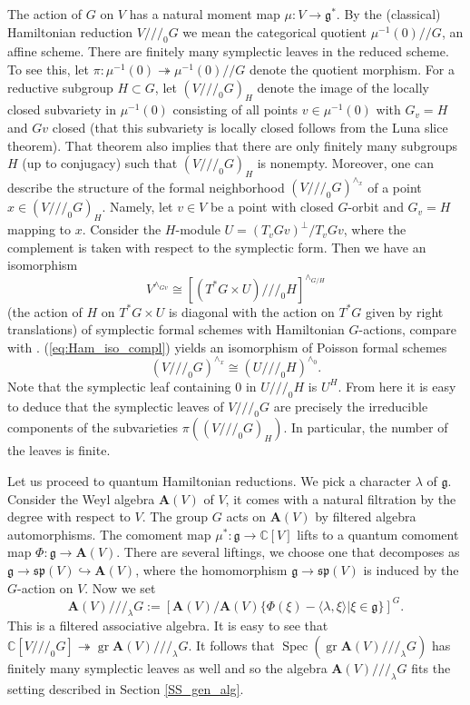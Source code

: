 \documentclass[12pt]{amsart}
\newcommand{\gr}{\operatorname{gr}}
\newcommand{\Weyl}{\mathbf{A}}
\newcommand{\g}{\mathfrak{g}}
\newcommand{\C}{\mathbb{C}}
\newcommand{\red}{/\!/\!/}
\newcommand{\quo}{/\!/}
\theoremstyle{definition}
\begin{document}
The action of $G$ on $V$ has a natural moment map $\mu:V\rightarrow \g^*$. By the (classical)
Hamiltonian reduction $V\red_0 G$ we mean the categorical quotient $\mu^{-1}(0)\quo G$,
an affine scheme. There are finitely many symplectic leaves in the reduced scheme.
To see this, let $\pi:\mu^{-1}(0)\twoheadrightarrow \mu^{-1}(0)\quo G$ denote the quotient
morphism. For a reductive subgroup $H\subset G$, let $(V\red_0 G)_H$ denote the image of
the locally closed subvariety in $\mu^{-1}(0)$ consisting of all points $v\in \mu^{-1}(0)$
with $G_v=H$ and $Gv$ closed (that this subvariety is locally closed follows from the Luna
slice theorem). That theorem also implies that there are only finitely many  subgroups
$H$ (up to conjugacy) such that $(V\red_0 G)_H$ is nonempty.  Moreover, one can describe the structure of the
formal neighborhood $(V\red_0 G)^{\wedge_x}$ of a point $x\in (V\red_0 G)_H$.
Namely, let $v\in V$ be a point with closed $G$-orbit and $G_v=H$ mapping to $x$.
Consider the $H$-module $U=(T_v Gv)^{\perp}/T_v Gv$, where the complement is taken with respect
to the symplectic form. Then we have an isomorphism
\begin{equation}\label{eq:Ham_iso_compl} V^{\wedge_{Gv}}\cong [(T^*G\times U)\red_0 H]^{\wedge_{G/H}}\end{equation}
(the action of $H$ on $T^*G\times U$
is diagonal with the action on $T^*G$ given by right translations) of symplectic formal
schemes with Hamiltonian $G$-actions, compare with \cite[Section 4]{CB_norm}. (\ref{eq:Ham_iso_compl}) yields an isomorphism of Poisson
formal schemes
\begin{equation}\label{eq:iso_compl}
(V\red_0 G)^{\wedge_x}\cong (U\red_0 H)^{\wedge_0}.
\end{equation}
Note that the symplectic leaf containing $0$ in $U\red_0 H$ is $U^H$. 
From here it is easy to deduce that the symplectic leaves of $V\red_0 G$ are precisely the irreducible
components of the subvarieties $\pi((V\red_0 G)_H)$. 
In particular, the number of the leaves
is finite.

Let us proceed to quantum Hamiltonian reductions. We pick a character
$\lambda$ of $\g$. Consider the Weyl algebra $\Weyl(V)$ of $V$, it comes
with a natural filtration by the degree with respect to $V$. The group $G$ acts on $\Weyl(V)$ by filtered algebra automorphisms.
The comoment map $\mu^*: \g\rightarrow \C[V]$ lifts to a quantum comoment map
$\Phi: \g\rightarrow \Weyl(V)$. There are several liftings, we choose one that decomposes
as $\g\rightarrow \mathfrak{sp}(V)\hookrightarrow \Weyl(V)$, where the homomorphism
$\g\rightarrow \mathfrak{sp}(V)$ is induced by the $G$-action on $V$.
Now we set
$$\Weyl(V)\red_\lambda G:=[\Weyl(V)/\Weyl(V)\{\Phi(\xi)-\langle  \lambda,\xi\rangle| \xi\in \g\}]^G.$$
This is a filtered associative algebra.
It is easy to see that $\C[V\red_0 G]\twoheadrightarrow \gr \Weyl(V)\red_\lambda G$.
It follows that $\operatorname{Spec}(\gr \Weyl(V)\red_\lambda G)$ has finitely many
symplectic leaves as well and so the algebra $\Weyl(V)\red_\lambda G$ fits
the setting described in Section \ref{SS_gen_alg}.
\end{document}
